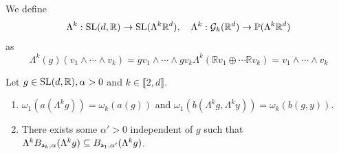 \documentclass{report}
\begin{document}
\begin{definition}
    We define
    \[
    \Lambda^k : \operatorname{{\mathrm{SL}}}(d, \mathbb R) \to \operatorname{{\mathrm{SL}}}(\Lambda^k \mathbb R^d), \quad
    \Lambda^k : \mathcal G_k(\mathbb R^d) \to \mathbb P(\Lambda^k \mathbb R^d)
    \]
    as
    \[
    \Lambda^k(g)(v_1 \wedge \cdots \wedge v_k) = g v_1 \wedge \cdots \wedge g v_k
    \Lambda^k(\mathbb R v_1 \oplus \cdots \mathbb R v_k) =  v_1 \wedge \cdots \wedge v_k
    \]
\end{definition}
\begin{lemma}
    Let $g \in \operatorname{{\mathrm{SL}}}(d, \mathbb R), \alpha > 0$ and $k \in \llbracket 2, d \rrbracket$.
    \begin{enumerate}[label=(\roman*)]
        \item $\omega_1(a(\Lambda^k g)) = \omega_k(a(g))$ and $\omega_1(b(\Lambda^k g, \Lambda^k y)) = \omega_k(b(g, y))$.
        \item There exists some $\alpha' > 0$ independent of $g$ such that $\Lambda^k B_{{\sf a}_k, \alpha}(\Lambda^k g) \subseteq B_{{\sf a}_1, \alpha'}(\Lambda^k g)$.
    \end{enumerate}
\end{lemma}
\end{document}
